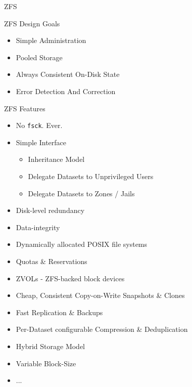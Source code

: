 \begin{frame}{}
\begin{center}
	\Huge ZFS
\end{center} 
\end{frame}

\begin{frame}{ZFS Design Goals}
	\begin{itemize}
		\item Simple Administration
		\item Pooled Storage
		\item Always Consistent On-Disk State
		\item Error Detection And Correction
	\end{itemize}	
\end{frame}

\begin{frame}[allowframebreaks]{ZFS Features}
	\begin{itemize}[]
		\item No \texttt{fsck}. Ever.
		\item Simple Interface
		\begin{itemize}
			\item Inheritance Model
			\item Delegate Datasets to Unprivileged Users
			\item Delegate Datasets to Zones / Jails
		\end{itemize}
		\item Disk-level redundancy
		\item Data-integrity
		\item Dynamically allocated POSIX file systems
		\item Quotas \& Reservations %
		\framebreak
		\item ZVOLs - ZFS-backed block devices %
		\item Cheap, Consistent Copy-on-Write Snapshots \& Clones
		\item Fast Replication \& Backups
		\item Per-Dataset configurable Compression \& Deduplication
		\item Hybrid Storage Model
		\item Variable Block-Size
		\framebreak
		\item ...
	\end{itemize}
\end{frame}

